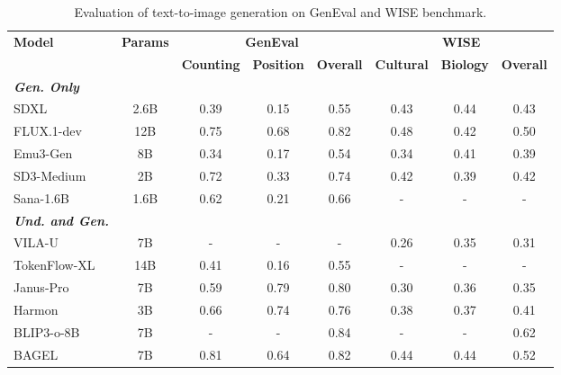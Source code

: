 \documentclass[runningheads]{llncs}
\begin{document}
\begin{table}[t]
\fontsize{8.5pt}{10pt}\selectfont
\centering
\caption{{Evaluation of text-to-image generation on GenEval and WISE benchmark.}}
\vspace{-10pt}
\label{tab:geneval_wise}
\begin{tabular}{lccccccc}
\toprule
\multirow{2}{*}{\textbf{Model}} & \multirow{2}{*}{\textbf{Params}} & \multicolumn{3}{c}{\textbf{GenEval}} & \multicolumn{3}{c}{\textbf{WISE}} \\
& & \textbf{Counting} & \textbf{Position} & \textbf{Overall} & \textbf{Cultural} & \textbf{Biology} & \textbf{Overall} \\
\midrule
\textit{\textbf{Gen. Only}} & & & & & & & \\
SDXL~\cite{podell2023sdxl} & 2.6B & 0.39 & 0.15 & 0.55 & 0.43 & 0.44 & 0.43 \\
FLUX.1-dev~\cite{flux2024} & 12B & 0.75 & 0.68 & 0.82 & 0.48 & 0.42 & 0.50 \\
Emu3-Gen~\cite{wang2024emu3} & 8B & 0.34 & 0.17 & 0.54 & 0.34 & 0.41 & 0.39 \\
SD3-Medium~\cite{esser2024scaling} & 2B & 0.72 & 0.33 & 0.74 & 0.42 & 0.39 & 0.42 \\
Sana-1.6B~\cite{xie2024sana} & 1.6B & 0.62 & 0.21 & 0.66 & - & - & - \\
\midrule
\textit{\textbf{Und. and Gen.}} & & & & & & & \\
VILA-U~\cite{wu2024vila} & 7B & - & - & - & 0.26 & 0.35 & 0.31 \\
TokenFlow-XL~\cite{qu2025tokenflow} & 14B & 0.41 & 0.16 & 0.55 & - & - & - \\
Janus-Pro~\cite{chen2025janus} & 7B & 0.59 & 0.79 & 0.80 & 0.30 & 0.36 & 0.35 \\
Harmon~\cite{wu2025harmon} & 3B & 0.66 & 0.74 & 0.76 & 0.38 & 0.37 & 0.41 \\
BLIP3-o-8B~\cite{chen2025blip3} & 7B & - & - & 0.84 & - & - & 0.62 \\
BAGEL~\cite{deng2025bagel} & 7B & 0.81 & 0.64 & 0.82 & 0.44 & 0.44 & 0.52 \\

\end{tabular}
\end{table}
\end{document}
